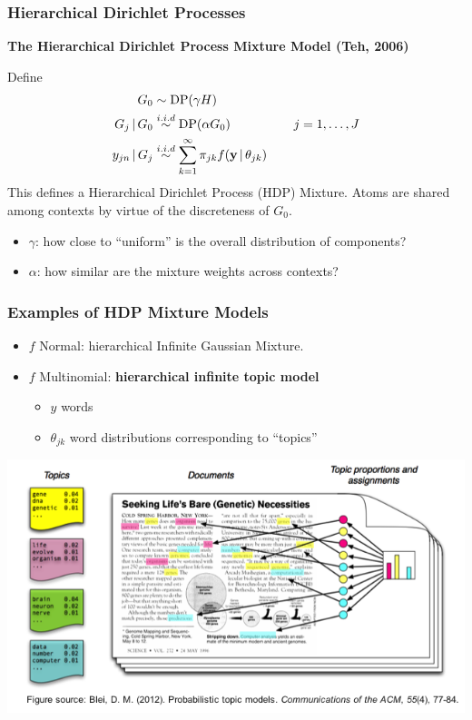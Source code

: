 \documentclass[11pt, mathserif, handout, table]{beamer}
\begin{document}
\begin{frame}
  \frametitle{Hierarchical Dirichlet Processes}
    \begin{exampleblock}{\small
        {\bf The Hierarchical Dirichlet Process Mixture Model (Teh,
          2006)}

\vspace{0.2in}
      Define
      \begin{align}
        G_0 &\sim \mathrm{DP}(\gamma H) \\
        G_j \, \vert \, G_0 &\stackrel{i.i.d}{\sim} \mathrm{DP}(\alpha G_0)
        \qquad \qquad \quad j = 1, \dots, J\\
        y_{jn} \, \vert \, G_j
        &\stackrel{i.i.d}{\sim} \sum_{k=1}^{\infty} \pi_{jk}
        f(\mathbf{y} \, \vert \, \theta_{jk})
      \end{align}
      This defines a Hierarchical Dirichlet Process (HDP) Mixture.
      Atoms are shared among contexts by virtue of the discreteness of
      $G_0$.
}
    \end{exampleblock}
    \begin{itemize}
    \item $\gamma$: how close to ``uniform'' is the overall
      distribution of components?
    \item $\alpha$: how similar are the mixture weights across contexts?
    \end{itemize}
\end{frame}
\begin{frame}
  \frametitle{Examples of HDP Mixture Models}
  \begin{itemize}
  \item $f$ Normal: hierarchical Infinite Gaussian Mixture.
  \item $f$ Multinomial: {\bf hierarchical infinite topic model}
    \begin{itemize}
    \item $y$ words
    \item $\theta_{jk}$ word distributions corresponding to ``topics''
    \end{itemize}
  \end{itemize}
  \begin{center}
    \includegraphics[width=\textwidth]{img/topic_models.png}
  \end{center}
\end{frame}
\end{document}
